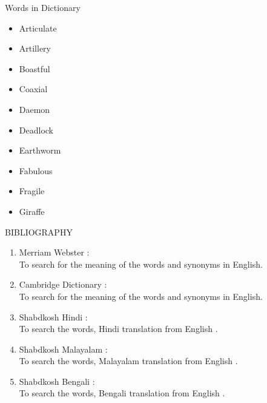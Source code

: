 \documentclass{article}
\begin{document}
\pagebreak

\centering\huge{Words in Dictionary}\newline
\hline 
\begin{itemize}
    \large\item Articulate \\
    \large\item Artillery \\
    \large\item Boastful \\
    \large\item Coaxial \\
    \large\item Daemon \\
    \large\item Deadlock \\
    \large\item Earthworm \\
    \large\item Fabulous \\
    \large\item Fragile \\
    \large\item Giraffe \\
\end{itemize}

\pagebreak
\centering\huge{BIBLIOGRAPHY}\newline
\hline 

\begin{enumerate}
   \large\item Merriam Webster : \href{https://www.merriam-webster.com/}{}\\
   To search for the meaning of the words and synonyms in English. \\

   \large\item Cambridge Dictionary : \href{https://dictionary.cambridge.org/}{}\\
   To search for the meaning of the words and synonyms in English. \\

   \large\item Shabdkosh Hindi : \href{https://www.shabdkosh.com/dictionary/english-hindi/}{}\\
   To search the words, Hindi translation from English . \\

   \large\item Shabdkosh Malayalam : \href{https://www.shabdkosh.com/dictionary/english-malayalam/}{}\\
   To search the words, Malayalam translation from English . \\

   \large\item Shabdkosh Bengali : \href{https://www.shabdkosh.com/dictionary/english-bengali/}{}\\
   To search the words, Bengali translation from English . \\   
\end{enumerate}
\end{document}
